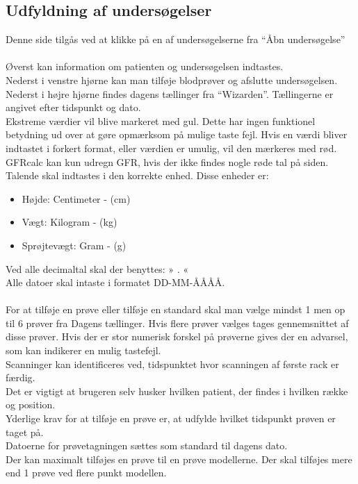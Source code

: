 \documentclass{article}
\begin{document}
\subsection{Udfyldning af undersøgelser}\label{fill_study}
Denne side tilgås ved at klikke på en af undersøgelserne fra “Åbn undersøgelse”\\\\
Øverst kan information om patienten og undersøgelsen indtastes. \\
Nederst i venstre hjørne kan man tilføje blodprøver og afslutte undersøgelsen. \\ 
Nederst i højre hjørne findes dagens tællinger fra “Wizarden”. Tællingerne er angivet efter tidspunkt og dato.  \\

Ekstreme værdier vil blive markeret med gul. Dette har ingen funktionel betydning ud over at gøre opmærksom på mulige taste fejl. Hvis en værdi  bliver indtastet i forkert format, eller værdien er umulig, vil den mærkeres med rød. GFRcalc kan kun udregn GFR, hvis der ikke findes nogle røde tal på siden. \\

Talende skal indtastes i den korrekte enhed. Disse enheder er:
\begin{itemize}
	\item Højde: Centimeter - (cm)
	\item Vægt: Kilogram - (kg)
	\item Sprøjtevægt: Gram - (g)
\end{itemize}
Ved alle decimaltal skal der benyttes: » . «\\%
Alle datoer skal intaste i formatet DD-MM-ÅÅÅÅ.\\\\
For at tilføje en prøve eller tilføje en standard skal man vælge mindst 1 men op til 6 prøver fra Dagens tællinger. Hvis flere prøver vælges tages gennemsnittet af disse prøver. Hvis der er stor numerisk forskel på prøverne gives der en advarsel, som kan indikerer en mulig tastefejl.\\
Scanninger kan identificeres ved, tidspunktet hvor scanningen af første rack er færdig.\\

Det er vigtigt at brugeren selv husker hvilken patient, der findes i hvilken række og position.\\

Yderlige krav for at tilføje en prøve er, at udfylde hvilket tidspunkt prøven er taget på.\\ Datoerne for prøvetagningen sættes som standard til dagens dato.\\
Der kan maximalt tilføjes en prøve til en prøve modellerne. Der skal tilføjes mere end 1 prøve ved flere punkt modellen.\\
\end{document}
